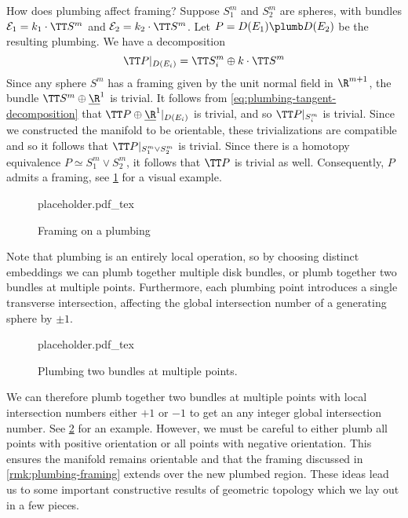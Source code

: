 \begin{remark}\label{rmk:plumbing-framing}
	How does plumbing affect framing? Suppose $S_1^m$ and $S_2^m$ are spheres, with bundles $\mathcal{E}_1 = k_1\cdot \TT S^m$ and $\mathcal{E}_2=k_2\cdot \TT S^m$. Let $P=D(E_1)\plumb D(E_2)$ be the resulting plumbing. We have a decomposition
	\begin{equation}\label{eq:plumbing-tangent-decomposition}
		\TT P|_{D(E_i)} = \TT S^m_i\oplus k\cdot \TT S^m
	\end{equation}
	Since any sphere $S^m$ has a framing given by the unit normal field in $\R^{m+1}$, the bundle $\TT S^m\oplus\underline{\R}^1$ is trivial.
	It follows from \cref{eq:plumbing-tangent-decomposition} that $\TT P\oplus \underline{\R}^1|_{D(E_i)}$ is trivial, and so $\TT P|_{S_i^m}$ is trivial. Since we constructed the manifold to be orientable, these trivializations are compatible and so it follows that $\TT P|_{S_1^m\vee S_2^m}$ is trivial. Since there is a homotopy equivalence $P\simeq S_1^m\vee S_2^m$, it follows that $\TT P$ is trivial as well. Consequently, $P$ admits a framing, see \cref{fig:framing-of-plumbed-manifold} for a visual example.
	\begin{figure}[ht]
		\centering
		{placeholder.pdf_tex}
		\caption{Framing on a plumbing}\label{fig:framing-of-plumbed-manifold}
	\end{figure}
\end{remark}

Note that plumbing is an entirely local operation, so by choosing distinct embeddings we can plumb together multiple disk bundles, or plumb together two bundles at multiple points. Furthermore, each plumbing point introduces a single transverse intersection, affecting the global intersection number of a generating sphere by $\pm 1$.
\begin{figure}[ht]
	\centering
	{placeholder.pdf_tex}
	\caption{Plumbing two bundles at multiple points.}\label{fig:plumbing-at-multiple-points}
\end{figure}
We can therefore plumb together two bundles at multiple points with local intersection numbers either $+1$ or $-1$ to get an any integer global intersection number. See \cref{fig:plumbing-at-multiple-points} for an example. However, we must be careful to either plumb all points with positive orientation or all points with negative orientation. This ensures the manifold remains orientable and that the framing discussed in \cref{rmk:plumbing-framing} extends over the new plumbed region.
These ideas lead us to some important constructive results of geometric topology which we lay out in a few pieces.

